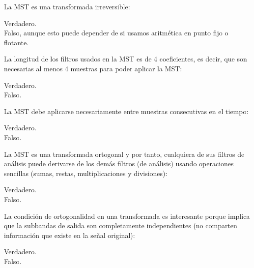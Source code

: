 \documentclass[legalpaper, 12pt, addpoints]{exam}
\begin{document}
\begin{questions}
\question La MST es una transformada irreversible:

\begin{oneparchoices}
  \choice Verdadero.\\
  \choice Falso, aunque esto puede depender de si usamos aritmética en punto fijo o flotante.
\end{oneparchoices}
  
\vspace{0.10in}

\question La longitud de los filtros usados en la MST es de 4
coeficientes, es decir, que son necesarias al menos 4 muestras para
poder aplicar la MST:

\begin{oneparchoices}
  \choice Verdadero.\\
  \choice Falso.
\end{oneparchoices}
  
\vspace{0.10in}

\question La MST debe aplicarse necesariamente entre muestras consecutivas en el tiempo:

\begin{oneparchoices}
  \choice Verdadero.\\
  \choice Falso.
\end{oneparchoices}
  
\vspace{0.10in}

\question La MST es una transformada ortogonal y por tanto, cualquiera
de sus filtros de análisis puede derivarse de los demás filtros (de
análisis) usando operaciones sencillas (sumas, restas,
multiplicaciones y divisiones):

\begin{oneparchoices}
  \choice Verdadero.\\
  \choice Falso.
\end{oneparchoices}
  
\vspace{0.10in}

\question La condición de ortogonalidad en una transformada es
interesante porque implica que la subbandas de salida son completamente
independientes (no comparten información que existe en la señal original):

\begin{oneparchoices}
  \choice Verdadero.\\
  \choice Falso.
\end{oneparchoices}
  

\end{questions}
\end{document}
